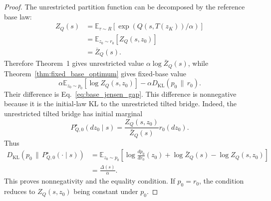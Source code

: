 \documentclass[10pt,a4paper]{amsart}
\begin{document}
\begin{proof}
The unrestricted partition function can be decomposed by the reference base law:
\begin{align}
  Z_Q(s)
  &=
  \mathbb E_{\tau\sim R}
  \left[
    \exp(Q(s,T(z_K))/\alpha)
  \right]
  \nonumber\\
  &=
  \mathbb E_{z_0\sim r_0}
  \left[
    Z_Q(s,z_0)
  \right]
  \nonumber\\
  &=
  \bar Z_Q(s).
\end{align}
Therefore Theorem~1 gives unrestricted value $\alpha\log \bar Z_Q(s)$, while Theorem~\ref{thm:fixed_base_optimum} gives fixed-base value
\begin{equation}
  \alpha
  \mathbb E_{z_0\sim p_0}
  \left[
    \log Z_Q(s,z_0)
  \right]
  -
  \alpha
  D_{\mathrm{KL}}
  \left(
    p_0
    \,\|\,
    r_0
  \right).
\end{equation}
Their difference is Eq.~\eqref{eq:base_jensen_gap}. This difference is nonnegative because it is the initial-law KL to the unrestricted tilted bridge. Indeed, the unrestricted tilted bridge has initial marginal
\begin{equation}
  P_{Q,0}^\star(dz_0\mid s)
  =
  \frac{
    Z_Q(s,z_0)
  }{
    \bar Z_Q(s)
  }
  r_0(dz_0).
\end{equation}
Thus
\begin{align}
  D_{\mathrm{KL}}
  \left(
    p_0
    \,\|\,
    P_{Q,0}^\star(\cdot\mid s)
  \right)
  &=
  \mathbb E_{z_0\sim p_0}
  \left[
    \log
    \frac{
      dp_0
    }{
      dr_0
    }(z_0)
    +
    \log \bar Z_Q(s)
    -
    \log Z_Q(s,z_0)
  \right]
  \nonumber\\
  &=
  \frac{
    \Delta(s)
  }{
    \alpha
  }.
\end{align}
This proves nonnegativity and the equality condition. If $p_0=r_0$, the condition reduces to $Z_Q(s,z_0)$ being constant under $p_0$.


\end{proof}
\end{document}
